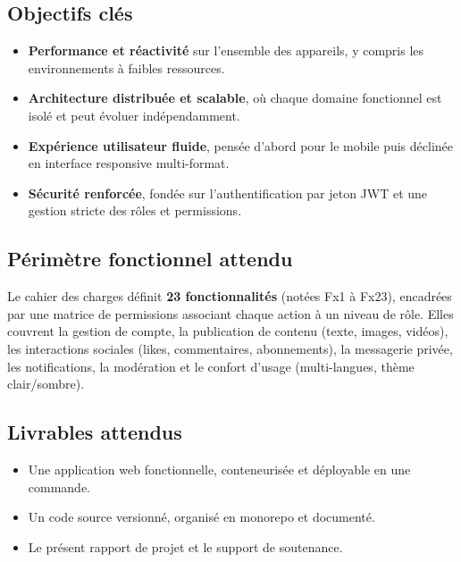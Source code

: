 \subsection{Objectifs clés}

\begin{itemize}[leftmargin=1.4em]
  \item \textbf{Performance et réactivité} sur l'ensemble des appareils, y compris
        les environnements à faibles ressources.
  \item \textbf{Architecture distribuée et scalable}, où chaque domaine
        fonctionnel est isolé et peut évoluer indépendamment.
  \item \textbf{Expérience utilisateur fluide}, pensée d'abord pour le mobile puis
        déclinée en interface responsive multi-format.
  \item \textbf{Sécurité renforcée}, fondée sur l'authentification par jeton JWT et
        une gestion stricte des rôles et permissions.
\end{itemize}

\subsection{Périmètre fonctionnel attendu}

Le cahier des charges définit \textbf{23 fonctionnalités} (notées Fx1 à Fx23),
encadrées par une matrice de permissions associant chaque action à un niveau de
rôle. Elles couvrent la gestion de compte, la publication de contenu (texte,
images, vidéos), les interactions sociales (likes, commentaires, abonnements), la
messagerie privée, les notifications, la modération et le confort d'usage
(multi-langues, thème clair/sombre).

\subsection{Livrables attendus}

\begin{itemize}[leftmargin=1.4em]
  \item Une application web fonctionnelle, conteneurisée et déployable en une
        commande.
  \item Un code source versionné, organisé en monorepo et documenté.
  \item Le présent rapport de projet et le support de soutenance.
\end{itemize}

\newpage

